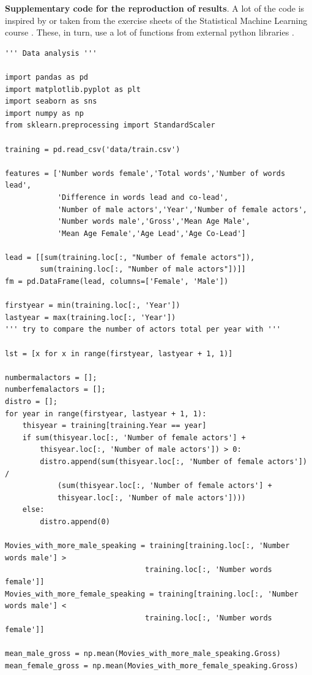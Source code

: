 \documentclass{article}
\begin{document}
\textbf{Supplementary code for the reproduction of results}. A lot of the code is inspired by or taken from the exercise sheets of the Statistical Machine Learning course \cite{smlexercises}. These, in turn, use a lot of functions from external python libraries \cite{Covariance,bagtree,crossval,dectree,Gridser,kfold,Logreg,matplotlib,MinMax,Polyfit,randtree,Regul,scatter_mat,StandardScaler}.

\begin{verbatim}
''' Data analysis '''

import pandas as pd
import matplotlib.pyplot as plt
import seaborn as sns
import numpy as np
from sklearn.preprocessing import StandardScaler

training = pd.read_csv('data/train.csv')

features = ['Number words female','Total words','Number of words lead',
            'Difference in words lead and co-lead',
            'Number of male actors','Year','Number of female actors',
            'Number words male','Gross','Mean Age Male',
            'Mean Age Female','Age Lead','Age Co-Lead']

lead = [[sum(training.loc[:, "Number of female actors"]), 
        sum(training.loc[:, "Number of male actors"])]]
fm = pd.DataFrame(lead, columns=['Female', 'Male'])

firstyear = min(training.loc[:, 'Year'])
lastyear = max(training.loc[:, 'Year'])
''' try to compare the number of actors total per year with '''

lst = [x for x in range(firstyear, lastyear + 1, 1)]

numbermalactors = [];
numberfemalactors = [];
distro = [];
for year in range(firstyear, lastyear + 1, 1):
    thisyear = training[training.Year == year]
    if sum(thisyear.loc[:, 'Number of female actors'] + 
        thisyear.loc[:, 'Number of male actors']) > 0:
        distro.append(sum(thisyear.loc[:, 'Number of female actors']) /
            (sum(thisyear.loc[:, 'Number of female actors'] + 
            thisyear.loc[:, 'Number of male actors'])))
    else:
        distro.append(0)

Movies_with_more_male_speaking = training[training.loc[:, 'Number words male'] > 
                                training.loc[:, 'Number words female']]
Movies_with_more_female_speaking = training[training.loc[:, 'Number words male'] < 
                                training.loc[:, 'Number words female']]

mean_male_gross = np.mean(Movies_with_more_male_speaking.Gross)
mean_female_gross = np.mean(Movies_with_more_female_speaking.Gross)


\end{verbatim}
\end{document}
